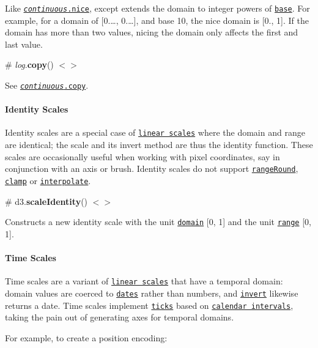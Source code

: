 Like \href{#continuous_nice}{\tt {\itshape continuous}.nice}, except extends the domain to integer powers of \href{#log_base}{\tt base}. For example, for a domain of \mbox{[}0.…, 0.…\mbox{]}, and base 10, the nice domain is \mbox{[}0., 1\mbox{]}. If the domain has more than two values, nicing the domain only affects the first and last value.

\label{_log_copy}%
\# {\itshape log}.{\bfseries copy}() \href{https://github.com/d3/d3-scale/blob/master/src/log.js#L123}{\tt $<$$>$}

See \href{#continuous_copy}{\tt {\itshape continuous}.copy}.

\paragraph*{Identity Scales}

Identity scales are a special case of \href{#linear-scales}{\tt linear scales} where the domain and range are identical; the scale and its invert method are thus the identity function. These scales are occasionally useful when working with pixel coordinates, say in conjunction with an axis or brush. Identity scales do not support \href{#continuous_rangeRound}{\tt range\+Round}, \href{#continuous_clamp}{\tt clamp} or \href{#continuous_interpolate}{\tt interpolate}.

\label{_scaleIdentity}%
\# d3.{\bfseries scale\+Identity}() \href{https://github.com/d3/d3-scale/blob/master/src/identity.js}{\tt $<$$>$}

Constructs a new identity scale with the unit \href{#continuous_domain}{\tt domain} \mbox{[}0, 1\mbox{]} and the unit \href{#continuous_range}{\tt range} \mbox{[}0, 1\mbox{]}.

\paragraph*{Time Scales}

Time scales are a variant of \href{#linear-scales}{\tt linear scales} that have a temporal domain\+: domain values are coerced to \href{https://developer.mozilla.org/en/JavaScript/Reference/Global_Objects/Date}{\tt dates} rather than numbers, and \href{#continuous_invert}{\tt invert} likewise returns a date. Time scales implement \href{#time_ticks}{\tt ticks} based on \href{https://github.com/d3/d3-time}{\tt calendar intervals}, taking the pain out of generating axes for temporal domains.

For example, to create a position encoding\+:


